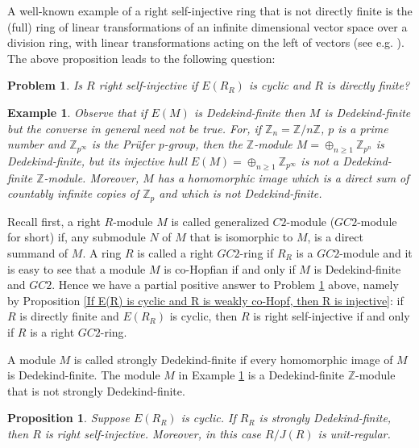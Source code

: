 \documentclass{amsart}
\theoremstyle{plain}
\newtheorem{example}[theorem]{Example}
\newtheorem{problem}[theorem]{Problem}
\newtheorem{proposition}[theorem]{Proposition}
\numberwithin{equation}{section}
\begin{document}
A well-known example of a right self-injective ring that is not directly finite is
the (full) ring of linear transformations of an infinite dimensional vector space over a division ring, with linear transformations acting on the left of
vectors (see e.g. \cite{O}). The above proposition leads to the following
question: 


\begin{problem}
\label{Problem 1} Is $R$ right self-injective if $E (R_{R})$ is cyclic and $R$ is directly finite? 
\end{problem}


\begin{example}
\label{M is DF but E(M) is not DF}Observe that if $E (M)$ is Dedekind-finite then $M$ is Dedekind-finite but the converse in general need not be true. For, if $\mathbb{Z}_{n} =\mathbb{Z}/n \mathbb{Z}$, $p$ is a prime number and $\mathbb{Z}_{p^{\infty }}$ is the Pr{\"u}fer $p$-group, then the $\mathbb{Z}$-module $M = \oplus _{n \geq 1}\mathbb{Z}_{p^{n}}$ is Dedekind-finite, but its injective hull $E (M) = \oplus _{n \geq 1}\mathbb{Z}_{p^{\infty }}$ is not a Dedekind-finite $\mathbb{Z}$-module. Moreover, $M$ has a homomorphic image which is a direct sum of countably infinite copies of $\mathbb{Z}_p$ and which is not Dedekind-finite. 
\end{example}

Recall first, a right $R$-module $M$ is called generalized $C 2$-module ($G C 2$-module for short) if, any submodule $N$ of $M$ that is isomorphic to $M$, is a direct summand of $M$. A ring $R$ is called a right $G C 2$-ring if $R_{R}$ is a $G C 2$-module and it is easy to see that a module $M$ is co-Hopfian if and only if $M$ is Dedekind-finite and $G C 2$. Hence we have a partial positive answer to Problem \ref{Problem 1} above, namely by Proposition
\ref{If E(R) is cyclic and R is weakly co-Hopf, then R is injective}:
if $R$ is directly finite and $E (R_{R})$ is cyclic, then $R$ is right self-injective if and only if $R$ is a right $G C 2$-ring. 

\medskip A module $M$ is called  {strongly Dedekind-finite} if every homomorphic image of $M$ is Dedekind-finite. 
The module $M$ in Example \ref{M is DF but E(M) is not DF} is a Dedekind-finite $\mathbb{Z}$-module that is not strongly Dedekind-finite. 

\begin{proposition}
\label{E(R) cyclic implies Injective V} Suppose $E (R_{R})$ is cyclic. If $R_{R}$ is strongly Dedekind-finite, then $R$ is right self-injective. Moreover, in this case $R/J (R)$ is unit-regular. 
\end{proposition}
\end{document}
